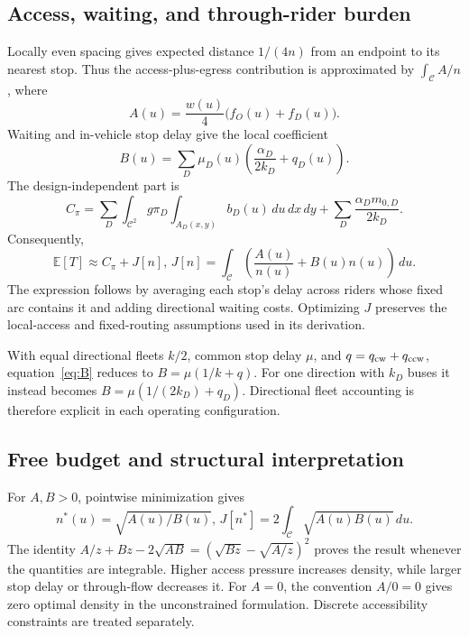 \documentclass[11pt]{article}
\theoremstyle{remark}\newtheorem{remark}[theorem]{Remark}
\newcommand{\C}{\mathcal C}
\newcommand{\E}{\mathbb E}
\begin{document}
\subsection{Access, waiting, and through-rider burden}
Locally even spacing gives expected distance $1/(4n)$ from an endpoint to its nearest stop. Thus the access-plus-egress contribution is approximated by $\int_\C A/n$, where
\begin{equation}
A(u)=\frac{w(u)}4\bigl(f_O(u)+f_D(u)\bigr).
\end{equation}
Waiting and in-vehicle stop delay give the local coefficient
\begin{equation}
B(u)=\sum_D\mu_D(u)\left(\frac{\alpha_D}{2k_D}+q_D(u)\right).\label{eq:B}
\end{equation}
The design-independent part is
\begin{equation}
C_\pi=\sum_D\int_{\C^2}g\pi_D\int_{A_D(x,y)}b_D(u)\,du\,dx\,dy
+\sum_D\frac{\alpha_Dm_{0,D}}{2k_D}.
\end{equation}
Consequently,
\begin{equation}
\E[T]\approx C_\pi+J[n],\,
J[n]=\int_\C\left(\frac{A(u)}{n(u)}+B(u)n(u)\right)\,du.\label{eq:J}
\end{equation}
The expression follows by averaging each stop's delay across riders whose fixed arc contains it and adding directional waiting costs. Optimizing $J$ preserves the local-access and fixed-routing assumptions used in its derivation.

With equal directional fleets $k/2$, common stop delay $\mu$, and $q=q_{\rm cw}+q_{\rm ccw}$, equation~\eqref{eq:B} reduces to $B=\mu(1/k+q)$. For one direction with $k_D$ buses it instead becomes $B=\mu(1/(2k_D)+q_D)$. Directional fleet accounting is therefore explicit in each operating configuration.

\subsection{Free budget and structural interpretation}
For $A,B>0$, pointwise minimization gives
\begin{equation}
n^*(u)=\sqrt{A(u)/B(u)},\,
J[n^*]=2\int_\C\sqrt{A(u)B(u)}\,du.\label{eq:free}
\end{equation}
The identity $A/z+Bz-2\sqrt{AB}=(\sqrt{Bz}-\sqrt{A/z})^2$ proves the result whenever the quantities are integrable. Higher access pressure increases density, while larger stop delay or through-flow decreases it. For $A=0$, the convention $A/0=0$ gives zero optimal density in the unconstrained formulation. Discrete accessibility constraints are treated separately.
\end{document}
